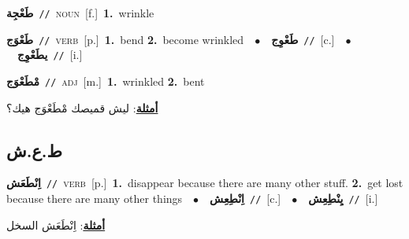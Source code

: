 \documentclass[10pt,a4paper,twoside]{article} %
\begin{document}
\begin{multicols}{2}
{\setlength\topsep{0pt}\textbf{\foreignlanguage{arabic}{طَعْجِة}}\ {\color{gray}\texttt{//}\color{black}}\ \textsc{noun}\ [f.]\ \textbf{1.}~wrinkle\ } \vspace{2mm}

{\setlength\topsep{0pt}\textbf{\foreignlanguage{arabic}{طَعْوَج}}\ {\color{gray}\texttt{//}\color{black}}\ \textsc{verb}\ [p.]\ \textbf{1.}~bend  \textbf{2.}~become wrinkled\ \ $\bullet$\ \ \setlength\topsep{0pt}\textbf{\foreignlanguage{arabic}{طَعْوِج}}\ {\color{gray}\texttt{//}\color{black}}\ [c.]\ \ $\bullet$\ \ \setlength\topsep{0pt}\textbf{\foreignlanguage{arabic}{يطَعْوِج}}\ {\color{gray}\texttt{//}\color{black}}\ [i.]\ } \vspace{2mm}

{\setlength\topsep{0pt}\textbf{\foreignlanguage{arabic}{مْطَعْوَج}}\ {\color{gray}\texttt{//}\color{black}}\ \textsc{adj}\ [m.]\ \textbf{1.}~wrinkled  \textbf{2.}~bent\  \begin{flushright}\color{gray}\foreignlanguage{arabic}{\textbf{\underline{\foreignlanguage{arabic}{أمثلة}}}: ليش قميصك مْطَعْوَج هيك؟}\end{flushright}\color{black}} \vspace{2mm}

\vspace{-3mm}
\subsection*{\color{blue}\foreignlanguage{arabic}{ط.ع.ش}\color{blue}{}} 

{\setlength\topsep{0pt}\textbf{\foreignlanguage{arabic}{اِنْطَعَش}}\ {\color{gray}\texttt{//}\color{black}}\ \textsc{verb}\ [p.]\ \textbf{1.}~disappear because there are many other stuff.  \textbf{2.}~get lost because there are many other things\ \ $\bullet$\ \ \setlength\topsep{0pt}\textbf{\foreignlanguage{arabic}{اِنْطِعِش}}\ {\color{gray}\texttt{//}\color{black}}\ [c.]\ \ $\bullet$\ \ \setlength\topsep{0pt}\textbf{\foreignlanguage{arabic}{يِنْطِعِش}}\ {\color{gray}\texttt{//}\color{black}}\ [i.]\  \begin{flushright}\color{gray}\foreignlanguage{arabic}{\textbf{\underline{\foreignlanguage{arabic}{أمثلة}}}: اِنْطَعَش السخل}\end{flushright}\color{black}} \vspace{2mm}


\end{multicols}
\end{document}
